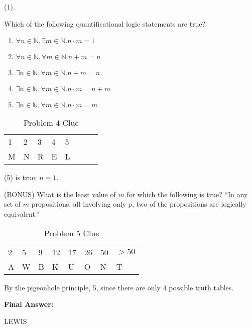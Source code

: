\documentclass[solution, letterpaper]{cs20inclass}
\begin{document}
\begin{solution}
(1).
\end{solution}

\problem Which of the following quantificational logic statements are true?

\begin{enumerate}
\item $\forall n \in \mathbb{N}, \exists m \in \mathbb{N} . n\cdot m = 1$
\item $\forall n \in \mathbb{N}, \forall m \in \mathbb{N} . n+m = n$
\item $\exists n \in \mathbb{N}, \forall m \in \mathbb{N} . n+m = n$
\item $\exists n \in \mathbb{N}, \forall m \in \mathbb{N} . n\cdot m = n+m$
\item $\exists n \in \mathbb{N}, \forall m \in \mathbb{N} . n\cdot m = m$
\end{enumerate}

\begin{table}[h]
\centering
\begin{tabular}{llllllll}
1 & 2 & 3 & 4 & 5 \\
M & N & R & E & L
\end{tabular}
\caption*{Problem 4 Clue}
\end{table}

\begin{solution}
(5) is true; $n = 1$.
\end{solution}

\problem (BONUS) What is the least value of $m$ for which the following is true? ``In any set of $m$ propositions, all involving only $p$, two of the propositions are logically equivalent.''

\begin{table}[h]
\centering
\begin{tabular}{llllllll}
2 & 5 & 9 & 12 & 17 & 26 & 50 & $>50$ \\
A & W & B & K & U & O & N & T
\end{tabular}
\caption*{Problem 5 Clue}
\end{table}

\begin{solution}
By the pigeonhole principle, 5, since there are only $4$ possible truth tables.
\end{solution}

\problem \textbf{Final Answer: }

\begin{solution}
LEWIS
\end{solution}
\end{document}
